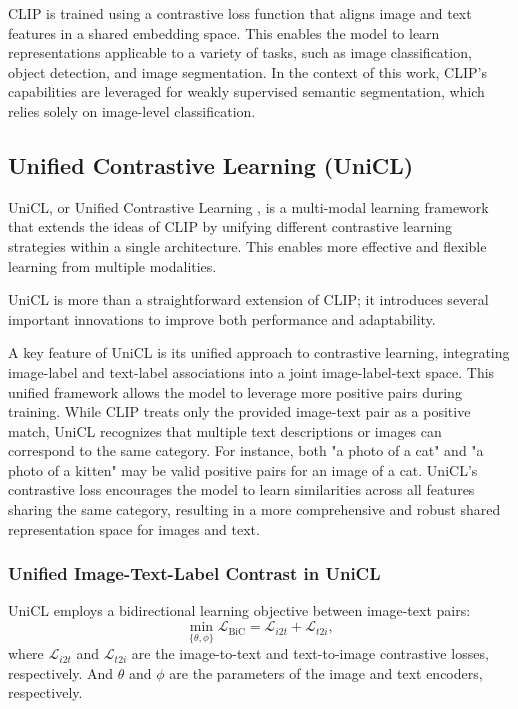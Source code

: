 CLIP is trained using a contrastive loss function that aligns image and text features in a shared embedding space. This enables the model to learn representations applicable to a variety of tasks, such as image classification, object detection, and image segmentation. In the context of this work, CLIP's capabilities are leveraged for weakly supervised semantic segmentation, which relies solely on image-level classification.

\subsection{Unified Contrastive Learning (UniCL)}
\label{subsec:unicl}

UniCL, or Unified Contrastive Learning \cite{vl_unicl}, is a multi-modal learning framework that extends the ideas of CLIP by unifying different contrastive learning strategies within a single architecture. This enables more effective and flexible learning from multiple modalities.

UniCL is more than a straightforward extension of CLIP; it introduces several important innovations to improve both performance and adaptability.

A key feature of UniCL is its unified approach to contrastive learning, integrating image-label and text-label associations into a joint image-label-text space. This unified framework allows the model to leverage more positive pairs during training. While CLIP treats only the provided image-text pair as a positive match, UniCL recognizes that multiple text descriptions or images can correspond to the same category. For instance, both "a photo of a cat" and "a photo of a kitten" may be valid positive pairs for an image of a cat. UniCL's contrastive loss encourages the model to learn similarities across all features sharing the same category, resulting in a more comprehensive and robust shared representation space for images and text.

\subsubsection{Unified Image-Text-Label Contrast in UniCL}
\label{subsec:unified_image_text_label_contrast}

UniCL employs a bidirectional learning objective between image-text pairs:
\begin{equation} \label{eq:unified_image_text_label_contrast}
    \min_{\{\theta, \phi\}} \mathcal{L}_{\text{BiC}} = \mathcal{L}_{i2t} + \mathcal{L}_{t2i},
\end{equation}
where \(\mathcal{L}_{i2t}\) and \(\mathcal{L}_{t2i}\) are the image-to-text and text-to-image contrastive losses, respectively. And \(\theta\) and \(\phi\) are the parameters of the image and text encoders, respectively.

